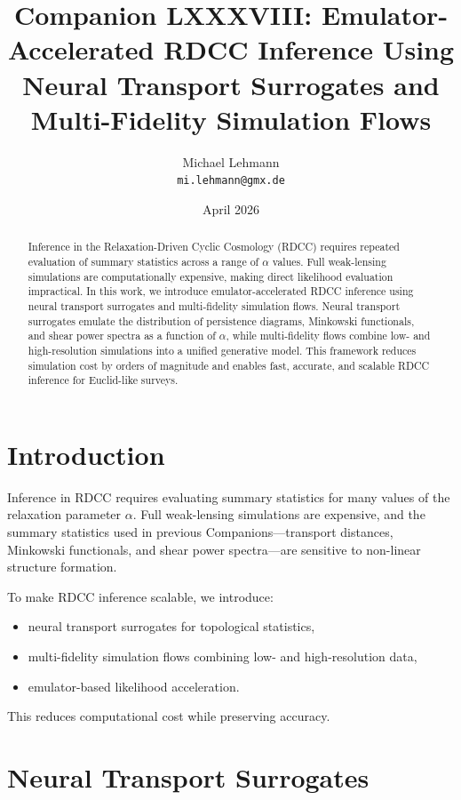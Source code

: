 \documentclass[11pt,a4paper]{article}
\title{\textbf{Companion LXXXVIII: Emulator-Accelerated RDCC Inference Using Neural Transport Surrogates and Multi-Fidelity Simulation Flows}}
\author{Michael Lehmann \\ \texttt{mi.lehmann@gmx.de}}
\date{April 2026}
\begin{document}
\maketitle

\begin{abstract}
Inference in the Relaxation-Driven Cyclic Cosmology (RDCC) requires repeated 
evaluation of summary statistics across a range of $\alpha$ values. Full 
weak-lensing simulations are computationally expensive, making direct likelihood 
evaluation impractical. In this work, we introduce emulator-accelerated RDCC 
inference using neural transport surrogates and multi-fidelity simulation flows. 
Neural transport surrogates emulate the distribution of persistence diagrams, 
Minkowski functionals, and shear power spectra as a function of $\alpha$, while 
multi-fidelity flows combine low- and high-resolution simulations into a unified 
generative model. This framework reduces simulation cost by orders of magnitude 
and enables fast, accurate, and scalable RDCC inference for Euclid-like surveys.
\end{abstract}
\section{Introduction}

Inference in RDCC requires evaluating summary statistics for many values of the 
relaxation parameter $\alpha$. Full weak-lensing simulations are expensive, and 
the summary statistics used in previous Companions—transport distances, Minkowski 
functionals, and shear power spectra—are sensitive to non-linear structure 
formation.

To make RDCC inference scalable, we introduce:

\begin{itemize}
    \item neural transport surrogates for topological statistics,
    \item multi-fidelity simulation flows combining low- and high-resolution data,
    \item emulator-based likelihood acceleration.
\end{itemize}

This reduces computational cost while preserving accuracy.
\section{Neural Transport Surrogates}
\end{document}
